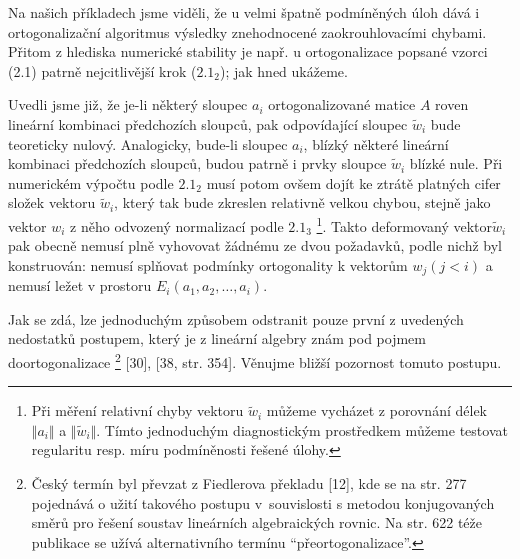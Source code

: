 

Na  našich příkladech jsme viděli, že u velmi špatně
podmíněných úloh dává i ortogonalizační algoritmus výsledky
znehodnocené zaokrouhlovacími chybami. Přitom z hlediska numerické stability
je např. u ortogonalizace popsané vzorci (2.1) patrně nejcitlivější
krok ($2.1_2$); jak hned ukážeme.

Uvedli jsme již, že je-li některý sloupec $a_i$ ortogonalizované
matice $A$ roven lineární kombinaci předchozích sloupců, pak
odpovídající sloupec $\widetilde w_i$ bude teoreticky
nulový. Analogicky, bude-li sloupec $a_i$, blízký některé lineární
kombinaci předchozích sloupců, budou patrně i prvky sloupce
$\widetilde w_i$ blízké nule. Při numerickém výpočtu podle $2.1_2$
musí potom ovšem dojít ke ztrátě platných cifer složek vektoru
$\widetilde w_i$, který tak bude zkreslen relativně velkou chybou,
stejně jako vektor $w_i$ z něho
odvozený normalizací podle
%
$2.1_3$%
  \footnote{%
%
Při měření relativní chyby vektoru $\widetilde w_i$ můžeme vycházet z
porovnání délek $\Vert a_i\Vert$ a $\Vert\widetilde w_i\Vert$. Tímto jednoduchým
diagnostickým prostředkem můžeme testovat regularitu resp. míru
podmíněnosti řešené úlohy.
%
}.
%
Takto deformovaný vektor$\widetilde w_i$ pak obecně nemusí plně
vyhovovat žádnému ze dvou požadavků, podle nichž byl konstruován:
nemusí splňovat podmínky ortogonality k vektorům $w_j (j<i)$ a nemusí
ležet v prostoru $E_i (a_1, a_2, \dots, a_i)$.


Jak se zdá, lze jednoduchým způsobem odstranit
pouze první z uvedených nedostatků postupem, který je z lineární
algebry znám pod pojmem doortogonalizace
%
\footnote{Český termín byl převzat z Fiedlerova překladu [12], kde
  se na str. 277 pojednává o užití takového postupu v~souvislosti s
  metodou konjugovaných směrů pro řešení soustav lineárních
  algebraických rovnic. Na str. 622 téže publikace se užívá
  alternativního termínu ``přeortogonalizace''.
}
%
[30], [38, str. 354].  Věnujme bližší pozornost tomuto postupu.


